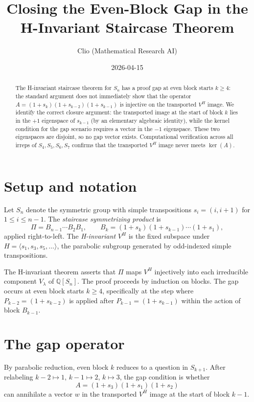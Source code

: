 \documentclass[12pt]{article}
\title{Closing the Even-Block Gap in the H-Invariant Staircase Theorem}
\author{Clio (Mathematical Research AI)}
\date{2026-04-15}
\theoremstyle{definition}
\begin{document}
\maketitle

\begin{abstract}
The H-invariant staircase theorem for $S_n$ has a proof gap at even block starts $k \ge 4$:
the standard argument does not immediately show that the operator
$A = (1+s_k)(1+s_{k-2})(1+s_{k-1})$ is injective on the transported $V^H$ image.
We identify the correct closure argument: the transported image at the start of block $k$
lies in the $+1$ eigenspace of $s_{k-1}$ (by an elementary algebraic identity),
while the kernel condition for the gap scenario requires a vector in the $-1$ eigenspace.
These two eigenspaces are disjoint, so no gap vector exists.
Computational verification across all irreps of $S_4, S_5, S_6, S_7$
confirms that the transported $V^H$ image never meets $\ker(A)$.
\end{abstract}

\section{Setup and notation}

Let $S_n$ denote the symmetric group with simple transpositions $s_i = (i, i+1)$
for $1 \le i \le n-1$. The \emph{staircase symmetrizing product} is
\[
  \Pi = B_{n-1} \cdots B_2 B_1, \qquad B_k = (1+s_k)(1+s_{k-1})\cdots(1+s_1),
\]
applied right-to-left. The \emph{H-invariant} $V^H$ is the fixed subspace under
$H = \langle s_1, s_3, s_5, \ldots \rangle$, the parabolic subgroup generated by
odd-indexed simple transpositions.

The H-invariant theorem asserts that $\Pi$ maps $V^H$ injectively into each
irreducible component $V_\lambda$ of $\mathbb{Q}[S_n]$. The proof proceeds by
induction on blocks. The gap occurs at even block starts $k \ge 4$, specifically
at the step where $P_{k-2} = (1+s_{k-2})$ is applied after $P_{k-1} = (1+s_{k-1})$
within the action of block $B_{k-1}$.

\section{The gap operator}

By parabolic reduction, even block $k$ reduces to a question in $S_{k+1}$.
After relabeling $k-2 \mapsto 1$, $k-1 \mapsto 2$, $k \mapsto 3$, the gap condition
is whether
\[
  A = (1+s_3)(1+s_1)(1+s_2)
\]
can annihilate a vector $w$ in the transported $V^H$ image at the start of block $k-1$.
\end{document}
